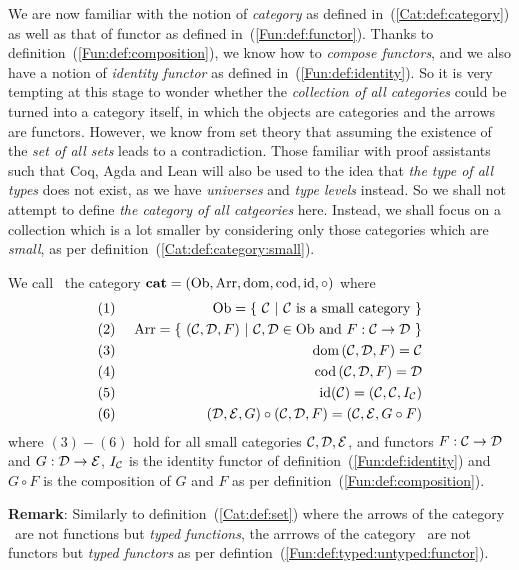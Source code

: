 We are now familiar with the notion of {\em category} as defined
in~(\ref{Cat:def:category}) as well as that of functor as defined
in~(\ref{Fun:def:functor}). Thanks to definition~(\ref{Fun:def:composition}),
we know how to {\em compose functors}, and we also have a notion of
{\em identity functor} as defined in~(\ref{Fun:def:identity}). So it is
very tempting at this stage to wonder whether the {\em collection of all
categories} could be turned into a category itself, in which the objects
are categories and the arrows are functors. However, we know from set theory 
that assuming the existence of the {\em set of all sets} leads to a 
contradiction. Those familiar with proof assistants such that Coq, Agda
and Lean will also be used to the idea that {\em the type of all types}
does not exist, as we have {\em universes} and {\em type levels} instead.
So we shall not attempt to define {\em the category of all catgeories} here.
Instead, we shall focus on a collection which is a lot smaller by considering
only those categories which are {\em small}, as per 
definition~(\ref{Cat:def:category:small}).

\begin{defin}\label{Fun:def:category:small:cat}
    We call \cat\ the category $\mbox{\bf cat}=(\mbox{\rm Ob}, \mbox{\rm Arr}, \mbox{\rm dom}, \mbox{\rm cod}, \mbox{\rm id}, \circ)$ where
    \begin{eqnarray*}
        (1)&\ &\ob = \{\ \Cat\ |\ \mbox{\Cat\ is a small category}\ \}\\
        (2)&\ &\arr =\{\ (\Cat,\Dat,F)\ |\ \Cat,\Dat\in\ob\ 
        \mbox{and}\ F:\Cat\to\Dat\ \}\\
        (3)&\ &\dom\,(\Cat,\Dat,F)=\Cat\\
        (4)&\ &\cod\,(\Cat,\Dat,F)=\Dat\\
        (5)&\ &\id(\Cat)=(\Cat,\Cat,I_{\cal C})\\
        (6)&\ &(\Dat,\Eat,G) \circ (\Cat,\Dat,F) = (\Cat,\Eat,G\circ F)
    \end{eqnarray*}
    where $(3)-(6)$ hold for all small categories $\mbox{$\cal C$},\mbox{$\cal D$},\mbox{$\cal E$}$, and
    functors $F:\mbox{$\cal C$}\to\mbox{$\cal D$}$ and $G:\mbox{$\cal D$}\to\mbox{$\cal E$}$, $I_{\cal C}$ is the identity
    functor of definition~(\ref{Fun:def:identity}) and $G\circ F$ is the 
    composition of $G$ and $F$ as per definition~(\ref{Fun:def:composition}).
\end{defin}

\noindent
{\bf Remark}: Similarly to definition~(\ref{Cat:def:set}) where the arrows
of the category \Set\ are not functions but {\em typed functions}, the arrrows
of the category \cat\ are not functors but {\em typed functors} as per 
defintion~(\ref{Fun:def:typed:untyped:functor}).

